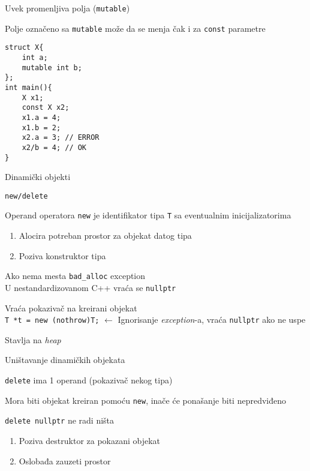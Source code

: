\documentclass{article}
\newenvironment{xitemize}{%
    
    \itemize
    \larger
}{%
    \enditemize
}
\let\olditemize\itemize
\let\endolditemize\enditemize
\renewenvironment{itemize}{%
    \smaller
    \olditemize
}{%
    \endolditemize
}
\providecommand{\inlinecode}[1]{\texttt{#1}}
\begin{document}
\begin{xitemize}
\item Uvek promenljiva polja (\inlinecode{mutable})
\begin{itemize}
    \item Polje označeno sa \inlinecode {mutable} može da se menja čak i za \inlinecode {const} parametre
    \begin{lstlisting}
struct X{
    int a;
    mutable int b;
};
int main(){
    X x1;
    const X x2;
    x1.a = 4;
    x1.b = 2;
    x2.a = 3; // ERROR
    x2/b = 4; // OK
}
    \end{lstlisting}
\end{itemize}

\newpage
\item Dinamički objekti
\begin{itemize}
    \item \inlinecode {new/delete}
    \item Operand operatora \inlinecode {new} je identifikator tipa \inlinecode T sa eventualnim inicijalizatorima
    \begin{enumerate}
        \item Alocira potreban prostor za objekat datog tipa
        \item Poziva konstruktor tipa
    \end{enumerate}
    \item Ako nema mesta \inlinecode {bad\_alloc} exception\\
    U nestandardizovanom C++ vraća se \inlinecode {nullptr}
    \item Vraća pokazivač na kreirani objekat\\
    \inlinecode{T *t = new (nothrow)T;} $\longleftarrow$ Ignorisanje \textit{exception}-a, vraća \inlinecode{nullptr} ako ne uspe
    \item Stavlja na \textit{heap}
\end{itemize}
\item Uništavanje dinamičkih objekata
\begin{itemize}
    \item \inlinecode {delete} ima 1 operand (pokazivač nekog tipa)
    \item Mora biti objekat kreiran pomoću \inlinecode {new}, inače će ponašanje biti nepredviđeno
    \item  \inlinecode{delete nullptr} ne radi ništa
    \begin{enumerate}
        \item Poziva destruktor za pokazani objekat
        \item Oslobađa zauzeti prostor

\end{enumerate}
\end{itemize}
\end{xitemize}
\end{document}
